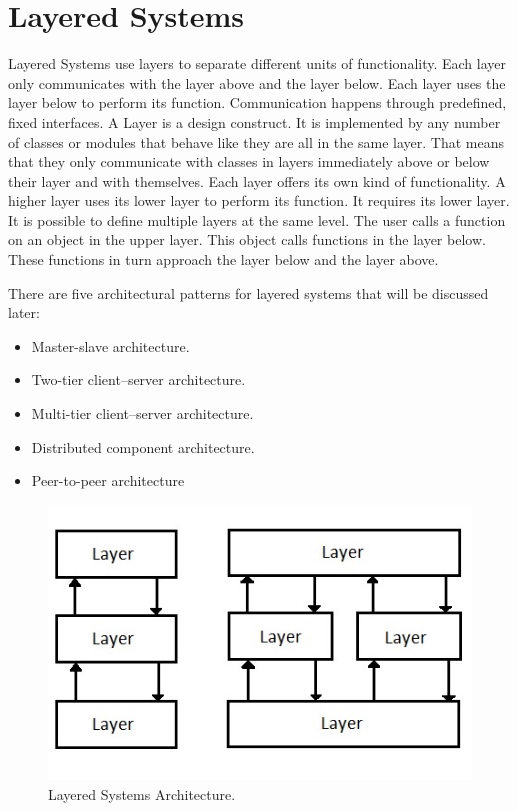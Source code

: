 \documentclass{article}
\begin{document}
\section{Layered Systems}
Layered Systems use layers to separate different units of functionality. Each layer only communicates with the layer above and the layer below. Each layer uses the layer below to perform its function. Communication happens through predefined, fixed interfaces. A Layer is a design construct. It is implemented by any number of classes or modules that behave like they are all in the same layer. That means that they only communicate with classes in layers immediately above or below their layer and with themselves. Each layer offers its own kind of functionality. A higher layer uses its lower layer to perform its function. It requires its lower layer. It is possible to define multiple layers at the same level. The user calls a function on an object in the upper layer. This object calls functions in the layer below. These functions in turn approach the layer below and the layer above.

\noindent There are five architectural patterns for layered systems that will be discussed later:
\begin{itemize}

\item Master-slave architecture.
\item Two-tier client–server architecture.
\item Multi-tier client–server architecture.
\item Distributed component architecture.
\item Peer-to-peer architecture

\end{itemize}

\begin{figure}[h]
\centering
\includegraphics[scale=0.65]{ls.jpg}
\caption{Layered Systems Architecture.}
\label{fig_ls}
\end{figure}
\end{document}
